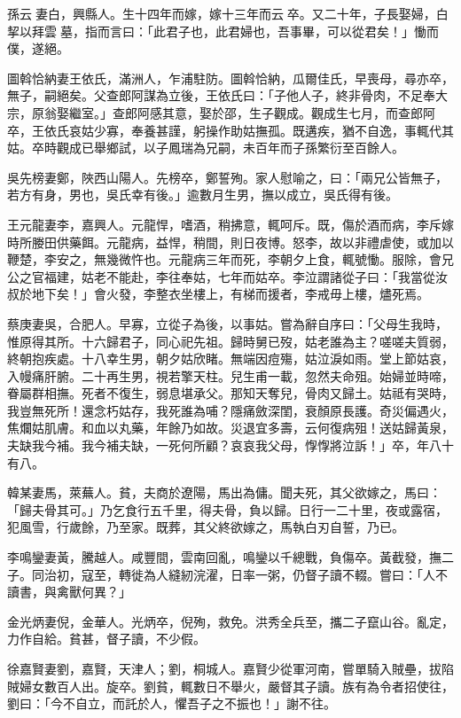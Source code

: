 \begin{pinyinscope}
孫云妻白，興縣人。生十四年而嫁，嫁十三年而云卒。又二十年，子長娶婦，白挈以拜雲墓，指而言曰：「此君子也，此君婦也，吾事畢，可以從君矣！」慟而僕，遂絕。

圖斡恰納妻王依氏，滿洲人，乍浦駐防。圖斡恰納，瓜爾佳氏，早喪母，尋亦卒，無子，嗣絕矣。父查郎阿謀為立後，王依氏曰：「子他人子，終非骨肉，不足奉大宗，原翁娶繼室。」查郎阿感其意，娶於邵，生子觀成。觀成生七月，而查郎阿卒，王依氏哀姑少寡，奉養甚謹，躬操作助姑撫孤。既遘疾，猶不自逸，事輒代其姑。卒時觀成已舉鄉試，以子鳳瑞為兄嗣，未百年而子孫繁衍至百餘人。

吳先榜妻鄭，陜西山陽人。先榜卒，鄭誓殉。家人慰喻之，曰：「兩兄公皆無子，若方有身，男也，吳氏幸有後。」逾數月生男，撫以成立，吳氏得有後。

王元龍妻李，嘉興人。元龍悍，嗜酒，稍拂意，輒呵斥。既，傷於酒而病，李斥嫁時所媵田供藥餌。元龍病，益悍，稍間，則日夜博。怒李，故以非禮虐使，或加以鞭楚，李安之，無幾微忤也。元龍病三年而死，李朝夕上食，輒號慟。服除，會兄公之官福建，姑老不能赴，李往奉姑，七年而姑卒。李泣謂諸從子曰：「我當從汝叔於地下矣！」會火發，李整衣坐樓上，有梯而援者，李戒毋上樓，燼死焉。

蔡庚妻吳，合肥人。早寡，立從子為後，以事姑。嘗為辭自序曰：「父母生我時，惟原得其所。十六歸君子，同心祀先祖。歸時舅已歿，姑老誰為主？嗟嗟夫質弱，終朝抱疾處。十八幸生男，朝夕姑欣睹。無端因痘殤，姑泣淚如雨。堂上節姑哀，入幔痛肝腑。二十再生男，視若擎天柱。兒生甫一載，忽然夫命殂。始婦並時啼，眷屬群相撫。死者不復生，弱息堪承父。那知天奪兒，骨肉又歸土。姑祗有哭時，我豈無死所！還念朽姑存，我死誰為哺？隱痛斂深閨，衰顏原長護。奇災偏遇火，焦爛姑肌膚。和血以丸藥，年餘乃如故。災退宜多壽，云何復病殂！送姑歸黃泉，夫缺我今補。我今補夫缺，一死何所顧？哀哀我父母，惸惸將泣訴！」卒，年八十有八。

韓某妻馬，萊蕪人。貧，夫商於遼陽，馬出為傭。聞夫死，其父欲嫁之，馬曰：「歸夫骨其可。」乃乞食行五千里，得夫骨，負以歸。日行一二十里，夜或露宿，犯風雪，行歲餘，乃至家。既葬，其父終欲嫁之，馬執白刃自誓，乃已。

李鳴鑾妻黃，騰越人。咸豐間，雲南回亂，鳴鑾以千總戰，負傷卒。黃截發，撫二子。同治初，寇至，轉徙為人縫紉浣濯，日率一粥，仍督子讀不輟。嘗曰：「人不讀書，與禽獸何異？」

金光炳妻倪，金華人。光炳卒，倪殉，救免。洪秀全兵至，攜二子竄山谷。亂定，力作自給。貧甚，督子讀，不少假。

徐嘉賢妻劉，嘉賢，天津人；劉，桐城人。嘉賢少從軍河南，嘗單騎入賊壘，拔陷賊婦女數百人出。旋卒。劉貧，輒數日不舉火，嚴督其子讀。族有為令者招使往，劉曰：「今不自立，而託於人，懼吾子之不振也！」謝不往。


\end{pinyinscope}
